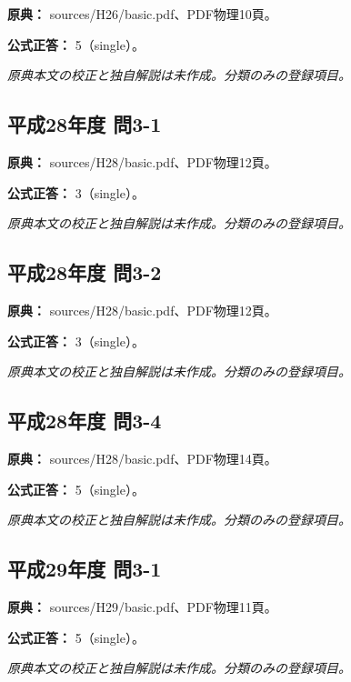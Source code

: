 \noindent\textbf{原典：} sources/H26/basic.pdf、PDF物理10頁。

\textbf{公式正答：} 5（single）。

\par\textit{原典本文の校正と独自解説は未作成。分類のみの登録項目。}

\subsection{平成28年度 問3-1}
\label{q:h28-reg-basic-3-1}

\noindent\textbf{原典：} sources/H28/basic.pdf、PDF物理12頁。

\textbf{公式正答：} 3（single）。

\par\textit{原典本文の校正と独自解説は未作成。分類のみの登録項目。}

\subsection{平成28年度 問3-2}
\label{q:h28-reg-basic-3-2}

\noindent\textbf{原典：} sources/H28/basic.pdf、PDF物理12頁。

\textbf{公式正答：} 3（single）。

\par\textit{原典本文の校正と独自解説は未作成。分類のみの登録項目。}

\subsection{平成28年度 問3-4}
\label{q:h28-reg-basic-3-4}

\noindent\textbf{原典：} sources/H28/basic.pdf、PDF物理14頁。

\textbf{公式正答：} 5（single）。

\par\textit{原典本文の校正と独自解説は未作成。分類のみの登録項目。}

\subsection{平成29年度 問3-1}
\label{q:h29-reg-basic-3-1}

\noindent\textbf{原典：} sources/H29/basic.pdf、PDF物理11頁。

\textbf{公式正答：} 5（single）。

\par\textit{原典本文の校正と独自解説は未作成。分類のみの登録項目。}

